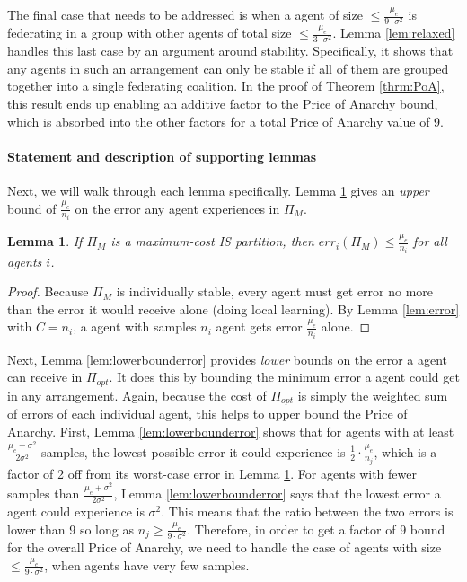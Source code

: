 \documentclass{article}
\newcommand{\cd}[0]{\cdot}
\newtheorem{lemma}{Lemma}
\newcommand{\mue}[0]{\ensuremath{\mu_e}}
\newcommand{\var}[0]{\ensuremath{\sigma^2}}
\newcommand{\ndraw}[0]{\ensuremath{n}}
\newcommand{\partition}[0]{\ensuremath{\Pi}}
\begin{document}
The final case that needs to be addressed is when a agent of size $\leq \frac{\mue}{9\cd \var}$ is federating in a group with other agents of total size $\leq \frac{\mue}{3\cd \var}$. Lemma \ref{lem:relaxed} handles this last case by an argument around stability. Specifically, it shows that any agents in such an arrangement can only be stable if all of them are grouped together into a single federating coalition. In the proof of Theorem \ref{thrm:PoA}, this result ends up enabling an additive factor to the Price of Anarchy bound, which is absorbed into the other factors for a total Price of Anarchy value of 9. 

\paragraph{\bf Statement and description of supporting lemmas} Next, we will walk through each lemma specifically. Lemma \ref{lem:betterthanalone} gives an \emph{upper} bound of $\frac{\mue}{\ndraw_i}$ on the error any agent experiences in $\partition_M$. 

\begin{lemma}\label{lem:betterthanalone}
If $\partition_M$ is a maximum-cost IS partition, then $err_i(\partition_M) \leq \frac{\mue}{\ndraw_i}$ for all agents $i$.
\end{lemma}
\begin{proof}
Because $\partition_M$ is individually stable, every agent must get error no more than the error it would receive alone (doing local learning). By Lemma \ref{lem:error} with $C= \ndraw_i$, a agent with samples $\ndraw_i$ agent gets error $\frac{\mue}{\ndraw_i}$ alone.  
\end{proof}

Next, Lemma \ref{lem:lowerbounderror} provides \emph{lower} bounds on the error a agent can receive in $\partition_{opt}$. It does this by bounding the minimum error a agent could get in any arrangement. Again, because the cost of $\partition_{opt}$ is simply the weighted sum of errors of each individual agent, this helps to upper bound the Price of Anarchy. First, Lemma \ref{lem:lowerbounderror} shows that for agents with at least $\frac{\mue+\var}{2\var}$ samples, the lowest possible error it could experience is $\frac{1}{2}\cd \frac{\mue}{\ndraw_j}$, which is a factor of 2 off from its worst-case error in Lemma \ref{lem:betterthanalone}. For agents with fewer samples than $\frac{\mue+\var}{2\var}$, Lemma \ref{lem:lowerbounderror} says that the lowest error a agent could experience is $\var$. This means that the ratio between the two errors is lower than 9 so long as $\ndraw_j \geq \frac{\mue}{9 \cd \var}$. Therefore, in order to get a factor of 9 bound for the overall Price of Anarchy, we need to handle the case of agents with size $\leq \frac{\mue}{9\cd \var}$, when agents have very few samples.
\end{document}
